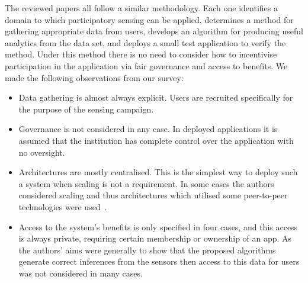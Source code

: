 The reviewed papers all follow a similar methodology. 
Each one identifies a domain to which participatory sensing can be applied, determines a method for gathering appropriate data from users, develops an algorithm for producing useful analytics from the data set, and deploys a small test application to verify the method. Under this method there is no need to consider how to incentivise participation in the application via fair governance and access to benefits. 
We made the following observations from our survey:
\begin{itemize}
\item Data gathering is almost always explicit. Users are recruited specifically for the purpose of the sensing campaign.
\item Governance is not considered in any case. In deployed applications it is assumed that the institution has complete control over the application with no oversight.
\item Architectures are mostly centralised. This is the simplest way to deploy such a system when scaling is not a requirement. In some cases the authors considered scaling and thus architectures which utilised some peer-to-peer technologies were used~\citep{Mendez2011,Hasenfratz2012}.
\item Access to the system's benefits is only specified in four cases, and this access is always private, requiring certain membership or ownership of an app. As the authors' aims were generally to show that the proposed algorithms generate correct inferences from the sensors then access to this data for users was not considered in many cases.
\end{itemize}

